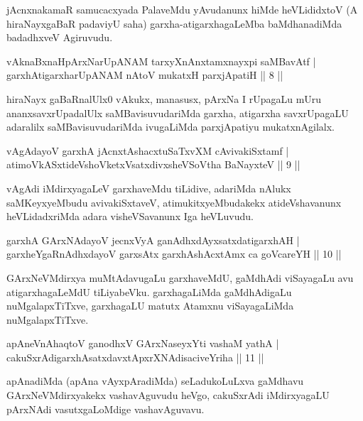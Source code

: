 \begin{artha}
jAcnxnakamaR samucacxyada PalaveMdu yAvudanunx hiMde heVLididxtoV (A hiraNayxgaBaR padaviyU saha) garxha-atigarxhagaLeMba baMdhanadiMda badadhxveV Agiruvudu.
\end{artha}

\begin{shl}
vAknaBxnaHpArxNarUpANAM tarxyXnAnxtamxnayxpi saMBavAtf |\\
garxhAtigarxharUpANAM nAtoV mukatxH parxjApatiH \hfill || 8 ||
\end{shl}

\begin{artha}
hiraNayx gaBaRnalUlx0 vAkukx, manasusx, pArxNa I rUpagaLu mUru ananxsavxrUpadalUlx saMBavisuvudariMda garxha, atigarxha savxrUpagaLU adaralilx saMBavisuvudariMda ivugaLiMda parxjApatiyu mukatxnAgilalx.
\end{artha}

\begin{shl}
vAgAdayoV garxhA jAcnxtAshacxtuSaTxvXM cAvivakiSxtamf |\\
atimoVkASxtideVshoVketxVsatxdivxsheVSoV\s tha BaNayxteV \hfill || 9 ||
\end{shl}

\begin{artha}
vAgAdi iMdirxyagaLeV garxhaveMdu tiLidive, adariMda nAlukx saMKeyx\-yeMbudu avivakiSxtaveV, atimukitxyeMbudakekx atideVshavanunx heVLidadxriMda adara visheVSavanunx Iga heVLuvudu.
\end{artha}

\begin{shl}
garxhA GArxNAdayoV jecnxVyA ganAdhxdAyxsatxdatigarxhAH |\\
garxheYgaRnAdhxdayoV garxsAtx garxhAshAcx\s \s tAmx ca goVcareYH \hfill || 10 ||
\end{shl}

\begin{artha}
GArxNeVMdirxya muMtAdavugaLu garxhaveMdU, gaMdhAdi viSayagaLu avu atigarxhagaLeMdU tiLiyabeVku. garxhagaLiMda gaMdhAdigaLu nuMgalapxTiTxve, garxhagaLU matutx Atamxnu viSayagaLiMda nuMgalapxTiTxve.
\end{artha}

\begin{shl}
apAneVnA\s \s haqtoV ganodhxV GArxNaseyxYti vashaM yathA |\\
cakuSxrAdigarxhAsatxdavxtApxrXNAdisaciveYriha \hfill || 11 ||
\end{shl}

\begin{artha}
apAnadiMda (apAna vAyxpAradiMda) seLadukoLuLxva gaMdhavu GArxNeVMdirxyakekx vashavAguvudu heVgo, cakuSxrAdi iMdirxyagaLU pArxNAdi vasutxgaLoMdige vasha\-vAguvavu.
\end{artha}

